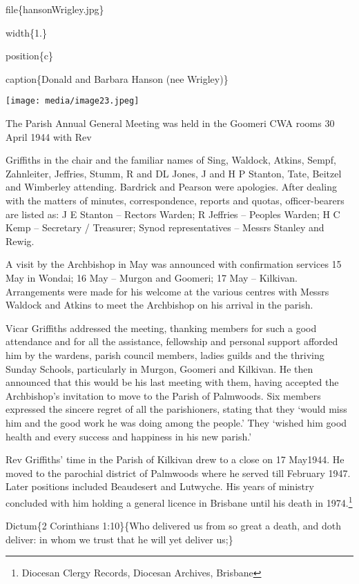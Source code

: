 file\{hansonWrigley.jpg\}

width\{1.\}

position\{c\}

caption\{Donald and Barbara Hanson (nee Wrigley)\}

\texttt{[image: media/image23.jpeg]}

The Parish Annual General Meeting was held in the Goomeri CWA rooms 30 April 1944 with Rev

Griffiths in the chair and the familiar names of Sing, Waldock, Atkins, Sempf, Zahnleiter, Jeffries, Stumm, R and DL Jones, J and H P Stanton, Tate, Beitzel and Wimberley attending. Bardrick and Pearson were apologies. After dealing with the matters of minutes, correspondence, reports and quotas, officer-bearers are listed as: J E Stanton -- Rectors Warden; R Jeffries -- Peoples Warden; H C Kemp -- Secretary / Treasurer; Synod representatives -- Messrs Stanley and Rewig.

A visit by the Archbishop in May was announced with confirmation services 15 May in Wondai; 16 May -- Murgon and Goomeri; 17 May -- Kilkivan. Arrangements were made for his welcome at the various centres with Messrs Waldock and Atkins to meet the Archbishop on his arrival in the parish.

Vicar Griffiths addressed the meeting, thanking members for such a good attendance and for all the assistance, fellowship and personal support afforded him by the wardens, parish council members, ladies guilds and the thriving Sunday Schools, particularly in Murgon, Goomeri and Kilkivan. He then announced that this would be his last meeting with them, having accepted the Archbishop's invitation to move to the Parish of Palmwoods. Six members expressed the sincere regret of all the parishioners, stating that they `would miss him and the good work he was doing among the people.' They `wished him good health and every success and happiness in his new parish.'

Rev Griffiths' time in the Parish of Kilkivan drew to a close on 17 May1944. He moved to the parochial district of Palmwoods where he served till February 1947. Later positions included Beaudesert and Lutwyche. His years of ministry concluded with him holding a general licence in Brisbane until his death in 1974.\footnote{Diocesan Clergy Records, Diocesan Archives, Brisbane}

Dictum\{2 Corinthians 1:10\}\{Who delivered us from so great a death, and doth deliver: in whom we trust that he will yet deliver us;\}

